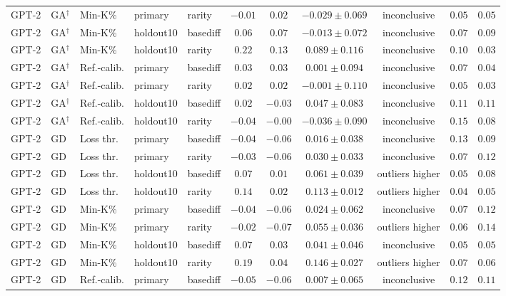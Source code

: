 {\begin{longtable}{@{\extracolsep{\fill}}lllllcccccc@{}}
GPT-2 & GA$^{\dagger}$ & Min-K\% & primary & rarity & $-0.01$ & $0.02$ & $-0.029 \pm 0.069$ & inconclusive & $0.05$ & $0.05$ \\
GPT-2 & GA$^{\dagger}$ & Min-K\% & holdout10 & basediff & $0.06$ & $0.07$ & $-0.013 \pm 0.072$ & inconclusive & $0.07$ & $0.09$ \\
GPT-2 & GA$^{\dagger}$ & Min-K\% & holdout10 & rarity & $0.22$ & $0.13$ & $0.089 \pm 0.116$ & inconclusive & $0.10$ & $0.03$ \\
GPT-2 & GA$^{\dagger}$ & Ref.-calib. & primary & basediff & $0.03$ & $0.03$ & $0.001 \pm 0.094$ & inconclusive & $0.07$ & $0.04$ \\
GPT-2 & GA$^{\dagger}$ & Ref.-calib. & primary & rarity & $0.02$ & $0.02$ & $-0.001 \pm 0.110$ & inconclusive & $0.05$ & $0.03$ \\
GPT-2 & GA$^{\dagger}$ & Ref.-calib. & holdout10 & basediff & $0.02$ & $-0.03$ & $0.047 \pm 0.083$ & inconclusive & $0.11$ & $0.11$ \\
GPT-2 & GA$^{\dagger}$ & Ref.-calib. & holdout10 & rarity & $-0.04$ & $-0.00$ & $-0.036 \pm 0.090$ & inconclusive & $0.15$ & $0.08$ \\
GPT-2 & GD & Loss thr. & primary & basediff & $-0.04$ & $-0.06$ & $0.016 \pm 0.038$ & inconclusive & $0.13$ & $0.09$ \\
GPT-2 & GD & Loss thr. & primary & rarity & $-0.03$ & $-0.06$ & $0.030 \pm 0.033$ & inconclusive & $0.07$ & $0.12$ \\
GPT-2 & GD & Loss thr. & holdout10 & basediff & $0.07$ & $0.01$ & $0.061 \pm 0.039$ & outliers higher & $0.05$ & $0.08$ \\
GPT-2 & GD & Loss thr. & holdout10 & rarity & $0.14$ & $0.02$ & $0.113 \pm 0.012$ & outliers higher & $0.04$ & $0.05$ \\
GPT-2 & GD & Min-K\% & primary & basediff & $-0.04$ & $-0.06$ & $0.024 \pm 0.062$ & inconclusive & $0.07$ & $0.12$ \\
GPT-2 & GD & Min-K\% & primary & rarity & $-0.02$ & $-0.07$ & $0.055 \pm 0.036$ & outliers higher & $0.06$ & $0.14$ \\
GPT-2 & GD & Min-K\% & holdout10 & basediff & $0.07$ & $0.03$ & $0.041 \pm 0.046$ & inconclusive & $0.05$ & $0.05$ \\
GPT-2 & GD & Min-K\% & holdout10 & rarity & $0.19$ & $0.04$ & $0.146 \pm 0.027$ & outliers higher & $0.07$ & $0.06$ \\
GPT-2 & GD & Ref.-calib. & primary & basediff & $-0.05$ & $-0.06$ & $0.007 \pm 0.065$ & inconclusive & $0.12$ & $0.11$ \\

\end{longtable}}
